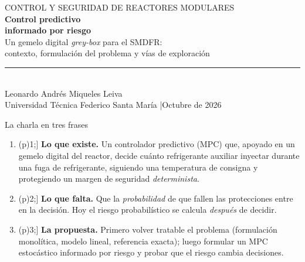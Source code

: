 \documentclass[aspectratio=169,10pt]{beamer}
\newcommand{\pill}[2]{\tikz[baseline=(p.base)]\node[fill=#1,text=white,rounded corners=2pt,inner sep=2pt,font=\scriptsize\bfseries](p){#2};}
\begin{document}
{
\begin{frame}[plain]
\vspace{.7cm}
{\color{USMCyan}\large CONTROL Y SEGURIDAD DE REACTORES MODULARES}\\[.5cm]
{\color{white}\Huge\bfseries Control predictivo\\[.15cm] informado por riesgo}\\[.4cm]
{\color{white}\large Un gemelo digital \emph{grey-box} para el SMDFR:\\[.05cm] contexto, formulación del problema y vías de exploración}\\[.6cm]
{\color{USMYellow}\rule{9.2cm}{2pt}}\\[.25cm]
{\color{white}\normalsize Leonardo Andrés Miqueles Leiva}\\[.08cm]
{\color{white}\small Universidad Técnica Federico Santa María \quad|\quad Octubre de 2026}
\end{frame}
}

\begin{frame}{La charla en tres frases}
\vspace{.25cm}
\begin{enumerate}\setlength{\itemsep}{.45cm}
\item[\pill{USMBlue}{1}] \textbf{Lo que existe.} Un controlador predictivo (MPC) que, apoyado en un gemelo digital del reactor, decide cuánto refrigerante auxiliar inyectar durante una fuga de refrigerante, siguiendo una temperatura de consigna y protegiendo un margen de seguridad \emph{determinista}.
\item[\pill{Warn}{2}] \textbf{Lo que falta.} Que la \emph{probabilidad} de que fallen las protecciones entre en la decisión. Hoy el riesgo probabilístico se calcula \emph{después} de decidir.
\item[\pill{Good}{3}] \textbf{La propuesta.} Primero volver tratable el problema (formulación monolítica, modelo lineal, referencia exacta); luego formular un MPC estocástico informado por riesgo y probar que el riesgo cambia decisiones.
\end{enumerate}
\vspace{.3cm}
\begin{center}
\end{center}
\end{frame}
\end{document}
